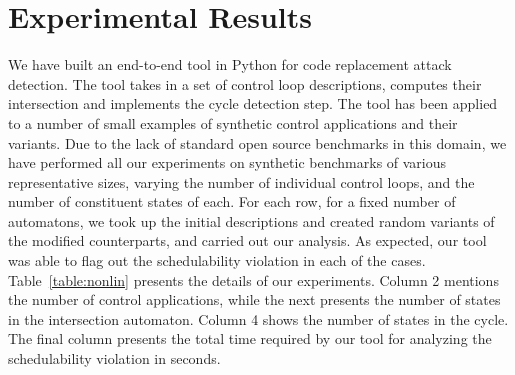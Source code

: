 \section{Experimental Results} \label{sec5}
\noindent
We have built an end-to-end tool in Python for code replacement attack detection.
The tool takes in a set of control loop descriptions, computes their intersection and 
implements the cycle detection step. The tool has been applied to a number of small 
examples of synthetic control applications and their variants. Due to the lack of standard open
source benchmarks in this domain, we have performed all our experiments on synthetic benchmarks of various representative sizes, varying the number of individual control loops, and the number of constituent states of each. For each row, for a fixed number of automatons, we took up the initial descriptions and created random variants of the modified counterparts, and carried out our analysis. As expected, our tool was able to flag out the schedulability violation in each of the cases. Table~\ref{table:nonlin} presents the details of our experiments. Column 2 mentions the number of control applications, while the next presents the number of states in the intersection automaton. Column 4 shows the number of states in the cycle. The final column presents the total time required by our tool for analyzing the schedulability violation in seconds.

